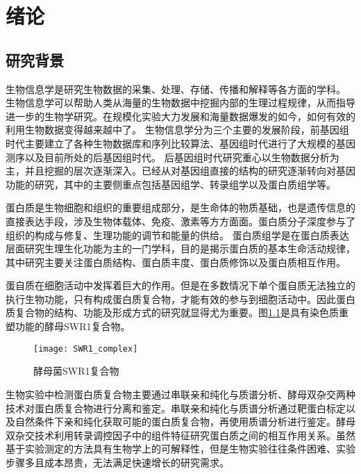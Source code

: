 \chapter{绪论}
\label{chapter:intro}


\section{研究背景}
\label{section:intro:background}

生物信息学是研究生物数据的采集、处理、存储、传播和解释等各方面的学科。
生物信息学可以帮助人类从海量的生物数据中挖掘内部的生理过程规律，从而指导进一步的生物学研究。在规模化实验大力发展和海量数据爆发的如今，如何有效的利用生物数据变得越来越中了。
生物信息学分为三个主要的发展阶段，前基因组时代主要建立了各种生物数据库和序列比较算法、基因组时代进行了大规模的基因测序以及目前所处的后基因组时代。
后基因组时代研究重心以生物数据分析为主，并且挖掘的层次逐渐深入。已经从对基因组直接的结构的研究逐渐转向对基因功能的研究，其中的主要侧重点包括基因组学、转录组学以及蛋白质组学等\cite{slepchenko_computational_2002}。

蛋白质是生物细胞和组织的重要组成部分，是生命体的物质基础，也是遗传信息的直接表达手段，涉及生物体载体、免疫、激素等方方面面。蛋白质分子深度参与了组织的构成与修复、生理功能的调节和能量的供给。
蛋白质组学\cite{schubert_quantitative_2017}是在蛋白质表达层面研究生理生化功能为主的一门学科，目的是揭示蛋白质的基本生命活动规律，其中研究主要关注蛋白质结构、蛋白质丰度、蛋白质修饰以及蛋白质相互作用。

蛋自质在细胞活动中发挥着巨大的作用。但是在多数情况下单个蛋自质无法独立的执行生物功能，只有构成蛋白质复合物，才能有效的参与到细胞活动中\cite{gavin_functional_2002}。因此蛋白质复合物的结构、功能及形成方式的研究就显得尤为重要。图\ref{fig:swr1_complex}是具有染色质重塑功能的酵母SWR1复合物。
\begin{figure}[htbp]
  \centering
  \texttt{[image: SWR1\_complex]}
  \caption{酵母菌SWR1复合物\cite{willhoft_structure_2018}}
  \label{fig:swr1_complex}
\end{figure}
生物实验中检测蛋白质复合物主要通过串联亲和纯化与质谱分析\cite{g_generic_1999}、酵母双杂交\cite{li_identification_1993}两种技术对蛋白质复合物进行分离和鉴定。串联亲和纯化与质谱分析通过靶蛋白标定以及自然条件下亲和纯化获取可能的蛋白质复合物，再使用质谱分析进行鉴定。酵母双杂交技术利用转录调控因子中的组件特征研究蛋白质之间的相互作用关系。虽然基于实验测定的方法具有生物学上的可解释性，但是生物实验往往条件困难、实验步骤多且成本昂贵，无法满足快速增长的研究需求。

